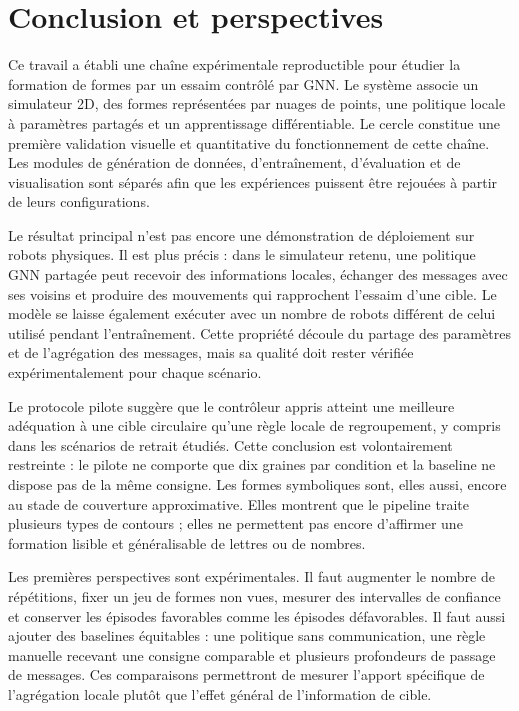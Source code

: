 \chapter{Conclusion et perspectives}
\label{chap:conclusion}

Ce travail a établi une chaîne expérimentale reproductible pour étudier la formation de formes par un essaim contrôlé par GNN. Le système associe un simulateur 2D, des formes représentées par nuages de points, une politique locale à paramètres partagés et un apprentissage différentiable. Le cercle constitue une première validation visuelle et quantitative du fonctionnement de cette chaîne. Les modules de génération de données, d'entraînement, d'évaluation et de visualisation sont séparés afin que les expériences puissent être rejouées à partir de leurs configurations.

Le résultat principal n'est pas encore une démonstration de déploiement sur robots physiques. Il est plus précis : dans le simulateur retenu, une politique GNN partagée peut recevoir des informations locales, échanger des messages avec ses voisins et produire des mouvements qui rapprochent l'essaim d'une cible. Le modèle se laisse également exécuter avec un nombre de robots différent de celui utilisé pendant l'entraînement. Cette propriété découle du partage des paramètres et de l'agrégation des messages, mais sa qualité doit rester vérifiée expérimentalement pour chaque scénario.

Le protocole pilote suggère que le contrôleur appris atteint une meilleure adéquation à une cible circulaire qu'une règle locale de regroupement, y compris dans les scénarios de retrait étudiés. Cette conclusion est volontairement restreinte : le pilote ne comporte que dix graines par condition et la baseline ne dispose pas de la même consigne. Les formes symboliques sont, elles aussi, encore au stade de couverture approximative. Elles montrent que le pipeline traite plusieurs types de contours ; elles ne permettent pas encore d'affirmer une formation lisible et généralisable de lettres ou de nombres.

Les premières perspectives sont expérimentales. Il faut augmenter le nombre de répétitions, fixer un jeu de formes non vues, mesurer des intervalles de confiance et conserver les épisodes favorables comme les épisodes défavorables. Il faut aussi ajouter des baselines équitables : une politique sans communication, une règle manuelle recevant une consigne comparable et plusieurs profondeurs de passage de messages. Ces comparaisons permettront de mesurer l'apport spécifique de l'agrégation locale plutôt que l'effet général de l'information de cible.

